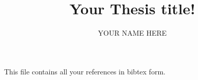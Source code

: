 \documentclass[10pt,a4paper]{book}
\title{Your Thesis title!}
\author{YOUR NAME HERE}					%
\begin{document}
	\frontmatter 
	\pagestyle{empty}
	
	\maketitle
	\makecertificate{}
	\tableofcontents
	\listoffigures
	\listoftables
	
	
	\mainmatter 
	\pagestyle{fancy} 
	
	
	\appendix
	
	This file contains all your references in bibtex form.
						
	
\end{document}
